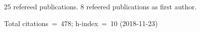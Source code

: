 25 refereed publications. 8 refeered publications as first author.

Total citations~=~478; h-index~=~10 (2018-11-23)